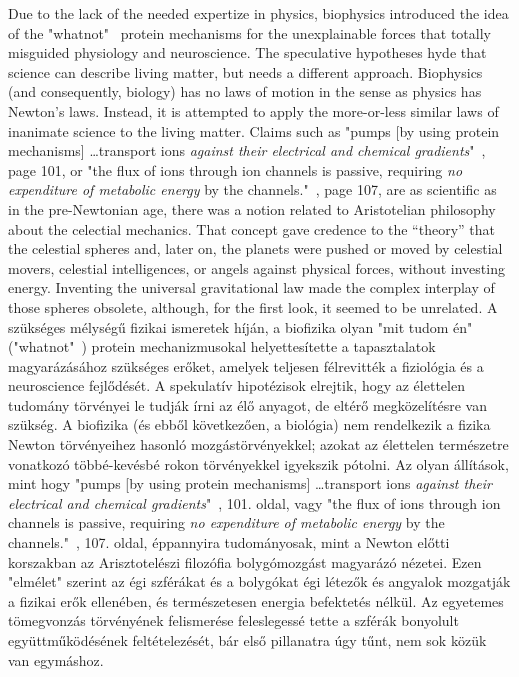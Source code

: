 \ifx\magyar\undefined %
Due to the lack of the needed expertize in physics,
biophysics introduced the idea of the "whatnot"~\cite{Schrodinger:1992} protein mechanisms 
for the unexplainable forces that totally misguided physiology and neuroscience.
The speculative hypotheses hyde that science can describe
living matter, but needs a different approach.
Biophysics (and consequently, biology) has no laws of motion in the sense as physics has Newton's laws. Instead, it is attempted to apply the more-or-less similar laws of inanimate science to the living matter.
Claims such as "pumps [by using protein mechanisms] \dots transport ions \textit{against their
electrical and chemical gradients}"~\cite{PrinciplesNeuralScience:2013}, page 101, 
or "the flux of ions through ion channels is passive,
requiring \textit{no expenditure of metabolic energy} by the
channels."~\cite{PrinciplesNeuralScience:2013}, page 107, are as scientific as in the pre-Newtonian age,
there was a notion related to Aristotelian philosophy about the celectial mechanics. That concept gave credence to the “theory” that the celestial spheres and, later on, the planets were pushed or moved by celestial movers, celestial intelligences, or angels against physical forces, without investing energy. Inventing the universal 
gravitational law made the complex interplay of those spheres obsolete,
although, for the first look, it seemed to be unrelated.
\else
A szükséges mélységű fizikai ismeretek híján, a biofizika
olyan "mit tudom én" ("whatnot"~\cite{Schrodinger:1992})
protein mechanizmusokal helyettesítette a tapasztalatok magyarázásához szükséges erőket, amelyek teljesen félrevitték
a fiziológia és a neuroscience fejlődését.
A spekulatív hipotézisok elrejtik, hogy az élettelen tudomány 
törvényei le tudják írni az élő anyagot, de eltérő megközelítésre van szükség.
A biofizika (és ebből következően, a biológia) nem rendelkezik 
a fizika Newton törvényeihez hasonló mozgástörvényekkel;
azokat az élettelen természetre vonatkozó többé-kevésbé rokon 
törvényekkel igyekszik pótolni.
Az olyan állítások, mint hogy "pumps [by using protein mechanisms] \dots transport ions \textit{against their
electrical and chemical gradients}"~\cite{PrinciplesNeuralScience:2013}, 101. oldal, 
vagy "the flux of ions through ion channels is passive,
requiring \textit{no expenditure of metabolic energy} by the
channels."~\cite{PrinciplesNeuralScience:2013}, 107. oldal,
éppannyira tudományosak, mint a Newton előtti korszakban 
az Arisztotelészi filozófia bolygómozgást magyarázó nézetei.
Ezen "elmélet" szerint az égi szférákat és a bolygókat
égi létezők és angyalok mozgatják a fizikai erők ellenében, és természetesen energia befektetés nélkül. 
Az egyetemes tömegvonzás törvényének felismerése
feleslegessé tette a szférák bonyolult együttműködésének
feltételezését, bár első pillanatra  úgy tűnt, nem sok
közük van egymáshoz.
\fi

